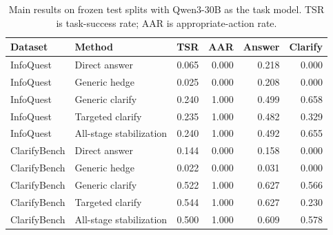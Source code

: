 \begin{table}[t]
\centering
\caption{Main results on frozen test splits with Qwen3-30B as the task model. TSR is task-success rate; AAR is appropriate-action rate.}
\label{tab:main-results}
\begin{tabular}{llrrrr}
\toprule
Dataset & Method & TSR & AAR & Answer & Clarify \\
\midrule
InfoQuest & Direct answer & 0.065 & 0.000 & 0.218 & 0.000 \\
InfoQuest & Generic hedge & 0.025 & 0.000 & 0.208 & 0.000 \\
InfoQuest & Generic clarify & 0.240 & 1.000 & 0.499 & 0.658 \\
InfoQuest & Targeted clarify & 0.235 & 1.000 & 0.482 & 0.329 \\
InfoQuest & All-stage stabilization & 0.240 & 1.000 & 0.492 & 0.655 \\
\midrule
ClarifyBench & Direct answer & 0.144 & 0.000 & 0.158 & 0.000 \\
ClarifyBench & Generic hedge & 0.022 & 0.000 & 0.031 & 0.000 \\
ClarifyBench & Generic clarify & 0.522 & 1.000 & 0.627 & 0.566 \\
ClarifyBench & Targeted clarify & 0.544 & 1.000 & 0.627 & 0.230 \\
ClarifyBench & All-stage stabilization & 0.500 & 1.000 & 0.609 & 0.578 \\
\bottomrule
\end{tabular}
\end{table}
